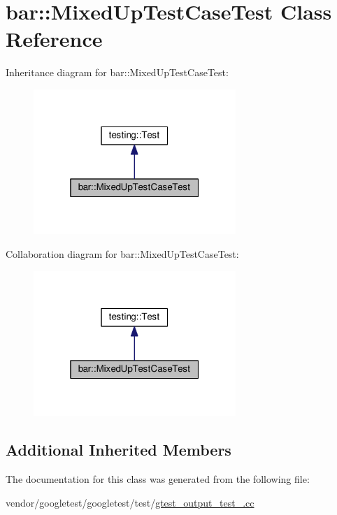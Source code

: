 \hypertarget{classbar_1_1MixedUpTestCaseTest}{}\section{bar\+:\+:Mixed\+Up\+Test\+Case\+Test Class Reference}
\label{classbar_1_1MixedUpTestCaseTest}


Inheritance diagram for bar\+:\+:Mixed\+Up\+Test\+Case\+Test\+:\nopagebreak
\begin{figure}[H]
\begin{center}
\leavevmode
\includegraphics[width=217pt]{classbar_1_1MixedUpTestCaseTest__inherit__graph}
\end{center}
\end{figure}


Collaboration diagram for bar\+:\+:Mixed\+Up\+Test\+Case\+Test\+:\nopagebreak
\begin{figure}[H]
\begin{center}
\leavevmode
\includegraphics[width=217pt]{classbar_1_1MixedUpTestCaseTest__coll__graph}
\end{center}
\end{figure}
\subsection*{Additional Inherited Members}


The documentation for this class was generated from the following file\+:\begin{DoxyCompactItemize}
\item 
vendor/googletest/googletest/test/\hyperlink{gtest__output__test___8cc}{gtest\+\_\+output\+\_\+test\+\_\+.\+cc}\end{DoxyCompactItemize}
